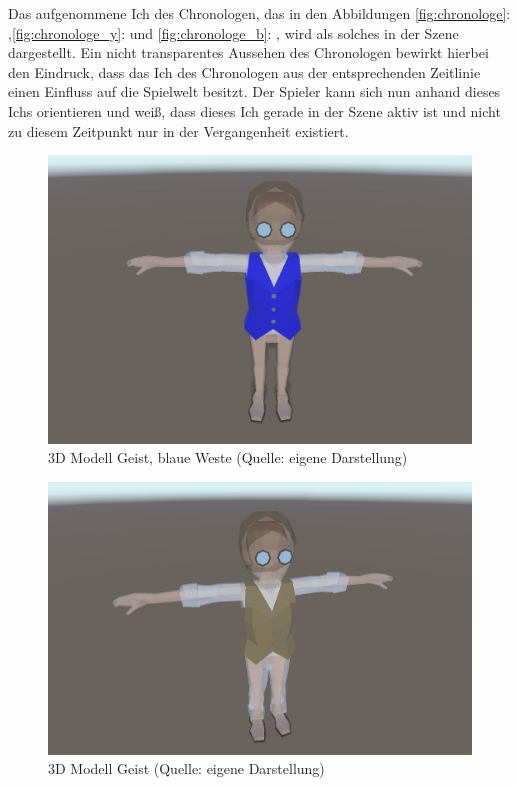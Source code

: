 Das aufgenommene Ich des Chronologen, das in den Abbildungen \ref{fig:chronologe}: ,\ref{fig:chronologe_y}:  und \ref{fig:chronologe_b}: , wird als solches in der Szene dargestellt. Ein nicht transparentes Aussehen des Chronologen bewirkt hierbei den Eindruck, dass das Ich des Chronologen aus der entsprechenden Zeitlinie einen Einfluss auf die Spielwelt besitzt. Der Spieler kann sich nun anhand dieses Ichs orientieren und weiß, dass dieses Ich gerade in der Szene aktiv ist und nicht zu diesem Zeitpunkt nur in der Vergangenheit existiert.
\begin{figure}[ht]
\centering
\includegraphics[width=0.8\linewidth]{content/pictures/Ghost_b.jpg}
\caption{3D Modell Geist, blaue Weste (Quelle: eigene Darstellung)}
\label{fig:ghost_b}
\end{figure}

\begin{figure}[ht]
\centering
\includegraphics[width=0.8\linewidth]{content/pictures/Ghost.jpg}
\caption{3D Modell Geist (Quelle: eigene Darstellung)}
\label{fig:ghost}
\end{figure}

